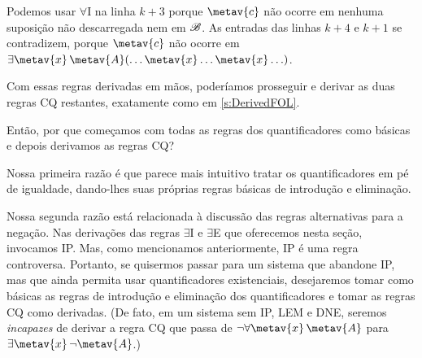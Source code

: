 \begin{fitchproof}
	\open
		\AS
	\close
	\open
		\AS
	\close
\end{fitchproof}\noindent
Podemos usar $\forall$I na linha $k+3$ porque $\metav{c}$ não ocorre em nenhuma suposição não descarregada nem em $\mathscr{B}$. As entradas das linhas $k+4$ e $k+1$ se contradizem, porque $\metav{c}$ não ocorre em $\exists \metav{x}\, \metav{A}(\ldots \metav{x} \ldots \metav{x} \ldots)$.

Com essas regras derivadas em mãos, poderíamos prosseguir e derivar as duas regras CQ restantes, exatamente como em \cref{s:DerivedFOL}.

Então, por que começamos com todas as regras dos quantificadores como básicas e depois derivamos as regras CQ?

Nossa primeira razão é que parece mais intuitivo tratar os quantificadores em pé de igualdade, dando-lhes suas próprias regras básicas de introdução e eliminação.

Nossa segunda razão está relacionada à discussão das regras alternativas para a negação. Nas derivações das regras $\exists$I e $\exists$E que oferecemos nesta seção, invocamos IP. Mas, como mencionamos anteriormente, IP é uma regra controversa. Portanto, se quisermos passar para um sistema que abandone IP, mas que ainda permita usar quantificadores existenciais, desejaremos tomar como básicas as regras de introdução e eliminação dos quantificadores e tomar as regras CQ como derivadas. (De fato, em um sistema sem IP, LEM e DNE, seremos \emph{incapazes} de derivar a regra CQ que passa de $\enot \forall \metav{x}\, \metav{A}$ para $\exists \metav{x}\, \enot \metav{A}$.)

